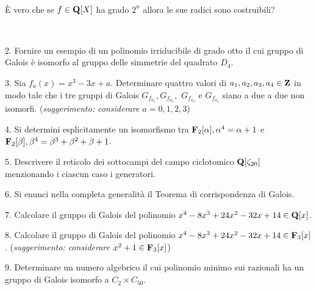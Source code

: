 \ \dotfill\ \bigskip\bigskip\bigskip\vfil

 \`E vero che se $f\in{\bf Q}[X]$ ha grado $2^n$ 
allora le sue radici sono costruibili?\medskip\bigskip\bigskip

\ \dotfill\ \bigskip\bigskip\bigskip


\vfil\eject


\item{2.} Fornire un esempio di un polinomio irriducibile di grado otto il cui gruppo di Galois \`e isomorfo al gruppo delle
simmetrie del quadrato $D_4$.\vv


\item{3.} Sia $f_a(x)=x^3-3x+a$. Determinare quattro valori di $a_1, a_2, a_3, a_4\in{\bf Z}$ in modo tale che i tre gruppi di Galois $G_{f_{a_1}}, 
G_{f_{a_2}},$ 
$G_{f_{a_3}}$ e $G_{f_{a_4}}$ siano a due a due non isomorfi. ({\it suggerimento: considerare $a=0,1,2,3$})
\ve\ \vs


\item{4.} Si determini esplicitamente un isomorfismo tra ${\bf F}_2[\alpha], \alpha^4=\alpha+1$ e ${\bf F}_2[\beta], 
\beta^4=\beta^3+\beta^2+\beta+1$. 
\vv

\item{5.} Descrivere il reticolo dei sottocampi del campo ciclotomico ${\bf Q}[\zeta_{20}]$ menzionando i ciascun caso i generatori.
\vv



\item{6.} Si enunci nella completa generalit\`a il Teorema di
corrispondenza di Galois.\ve\ \vs


\item{7.} Calcolare il gruppo di Galois del polinomio $x^4 - 8x^3 + 24x^2 - 32x + 14
\in {\bf Q}[x]$.\vskip7cm\vv\vv

\item{8.} Calcolare il gruppo di Galois del polinomio $x^4 - 8x^3 + 24x^2 - 32x + 14
\in {\bf F}_3[x]$. ({\it suggerimento: considerare $x^2+1\in {\bf F}_3[x]$})\vskip7cm\vv\vv

\item{9.} Determinare un numero algebrico il cui polinomio minimo sui razionali ha un gruppo di 
Galois isomorfo a $C_{2}\times C_{50}$.

\vv



\ \vst
 \bye

